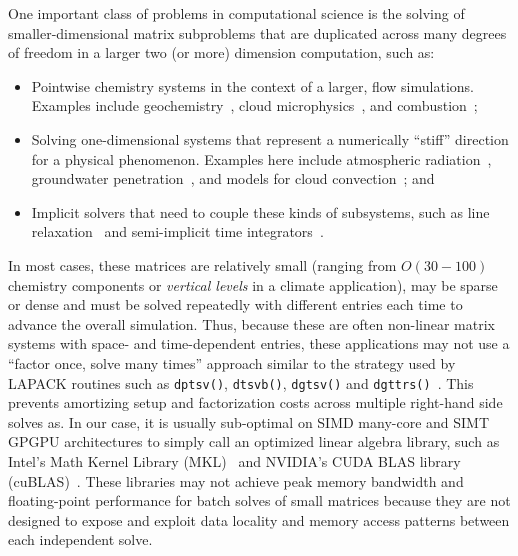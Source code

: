 \documentclass{sig-alternate-05-2015}
\begin{document}
One important class of problems in computational science is the solving
  of smaller-dimensional matrix subproblems that are duplicated across
  many degrees of freedom in a larger two (or more) dimension computation,
  such as:
\begin{itemize}
\item Pointwise chemistry systems in the context of a larger, 
  flow simulations. 
Examples include geochemistry~\cite{PFLOTRAN_2010}, 
  cloud microphysics~\cite{MG2_2015}, and combustion~\cite{PaznerEtAl_2016};
\item Solving one-dimensional systems that represent a numerically ``stiff''
  direction for a physical phenomenon.
Examples here include atmospheric radiation~\cite{RRTMG_2008}, groundwater
  penetration~\cite{CLM_PFLO_2016}, and models for 
  cloud convection~\cite{SAM_2005}; and
\item Implicit solvers that need to couple these kinds of subsystems, 
  such as line relaxation~\cite{TrottenbergEtAl_2000} and 
  semi-implicit time integrators~\cite{WellerEtAl_2013}.
\end{itemize}
In most cases, these matrices are relatively small 
  (ranging from \(O(30-100)\) chemistry components or \emph{vertical levels}
  in a climate application), may be sparse or dense and must be solved
  repeatedly with different entries each time to advance the overall simulation.
Thus, because these are often non-linear matrix systems with space- and 
  time-dependent entries, these applications may not use a 
  ``factor once, solve many times'' approach similar to the strategy used by
  LAPACK routines such as \lstinline{dptsv()}, \lstinline{dtsvb()},
  \lstinline{dgtsv()} and \lstinline{dgttrs()}~\cite{intel_mkl_manual}.
This prevents amortizing setup and factorization costs across multiple
  right-hand side solves as.
In our case, it is usually sub-optimal on SIMD many-core and SIMT GPGPU
  architectures to simply call an optimized linear algebra library, 
  such as Intel's Math Kernel Library (MKL)~\cite{mkl_website} and NVIDIA's
  CUDA BLAS library (cuBLAS)~\cite{cublas_website}.
These libraries may not achieve peak memory bandwidth and floating-point
  performance for batch solves of small matrices because they are not designed
  to expose and exploit data locality and memory access patterns between each
  independent solve.
  
\end{document}
